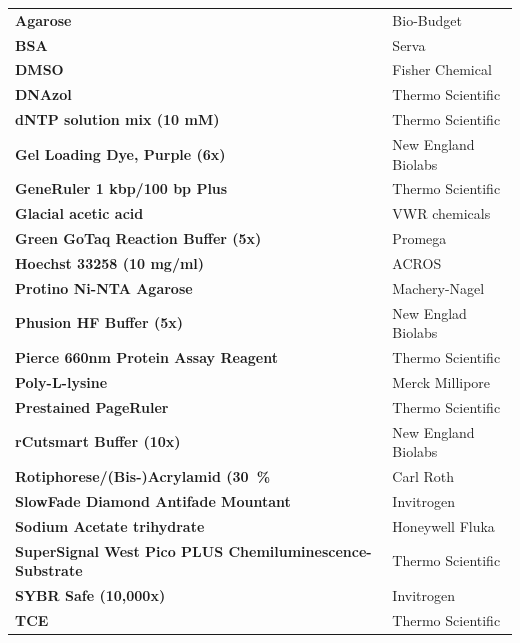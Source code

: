 \begin{longtable}{|L{11cm}|Y{3.5cm}|}
 \textbf{Agarose} & Bio-Budget \\
                        \textbf{\Gls{BSA}} & Serva  \\  
 \textbf{\Gls{DMSO}} & Fisher Chemical \\
                        \textbf{DNAzol} & Thermo Scientific  \\  
 \textbf{\Gls{dNTP} solution mix (10 mM)} & Thermo Scientific \\
                         \textbf{Gel Loading Dye, Purple (6x)} & New England Biolabs \\  
 \textbf{GeneRuler 1 kbp/100 bp Plus} & Thermo Scientific \\
                         \textbf{Glacial acetic acid} &   VWR chemicals \\ 
 \textbf{Green GoTaq Reaction Buffer (5x)} & Promega  \\
                         \textbf{Hoechst 33258 (10 mg/ml)} & ACROS  \\
 \textbf{Protino Ni-NTA Agarose} & Machery-Nagel  \\
                          \textbf{Phusion HF Buffer (5x)} & New Englad Biolabs  \\
 \textbf{Pierce 660nm Protein Assay Reagent} & Thermo Scientific\\ 
                         \textbf{Poly-L-lysine} & Merck Millipore \\
 \textbf{Prestained PageRuler} & Thermo Scientific \\ 
                         \textbf{rCutsmart Buffer (10x)} & New England Biolabs \\            
 \textbf{Rotiphorese/(Bis-)Acrylamid (30~\%} & Carl Roth \\
                        \textbf{SlowFade Diamond Antifade Mountant} & Invitrogen \\ 
 \textbf{Sodium Acetate trihydrate} & Honeywell Fluka \\
                        \textbf{SuperSignal West Pico PLUS Chemiluminescence-Substrate} & Thermo Scientific \\
  \textbf{SYBR Safe (10,000x)} & Invitrogen \\
                        \textbf{\Gls{TCE}} & Thermo Scientific \\
\end{longtable}

